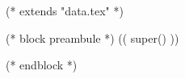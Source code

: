 %
%
%

(* extends "data.tex" *)

(* block preambule *)
(( super() ))

\usepackage{venturisold}
\renewcommand{\printchord}[1]{\mdseries\ttfamily\upshape#1}

\usepackage{licence}
(* endblock *)
